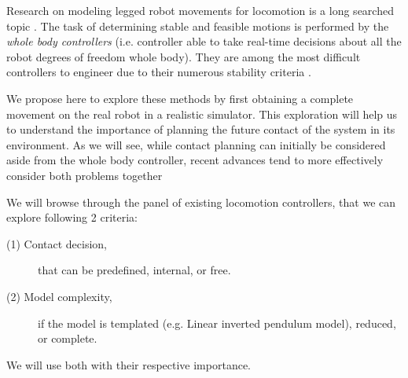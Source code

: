 
Research on modeling legged robot movements for locomotion is a long searched topic \cite{history_humanoid_robots}.
The task of determining stable and feasible motions is performed by the \textit{whole body controllers} (i.e. controller able to take real-time decisions about all the robot degrees of freedom whole body). They are among the most difficult controllers to engineer due to their numerous stability criteria \cite{chevallereau_book, kajita_intro_humanoid_robotics}.


We propose here to explore these methods by first obtaining a complete movement on the real robot in a realistic simulator.
This exploration will help us to understand the importance of planning the future contact of the system in its environment.
As we will see, while contact planning can initially be considered aside from the whole body controller, recent advances tend to more effectively consider both problems together

We will browse through the panel of existing locomotion controllers, that we can explore following 2 criteria:
\begin{description}
   \item[(1) Contact decision,] that can be predefined, internal, or free.
   \item[(2) Model complexity,] if the model is templated (e.g. Linear inverted pendulum model), reduced, or complete.
\end{description}
We will use both with their respective importance.

